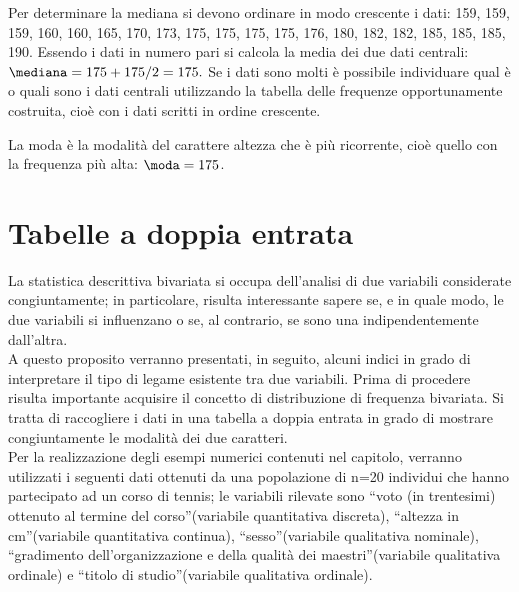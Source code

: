 \begin{esempio}
Per determinare la mediana si devono ordinare in modo crescente i dati:
159, 159, 159, 160, 160, 165, 170, 173, 175, 175, 175, 175, 176, 180, 182, 
182, 185, 185, 185, 190.
Essendo i dati in numero pari si calcola la media dei due dati centrali:
\(\mediana = {175+175}/{2}=175.\)
Se i dati sono molti è possibile individuare qual è o quali sono i dati 
centrali utilizzando la tabella delle
frequenze opportunamente costruita, cioè con i dati scritti in ordine 
crescente.

La moda è la modalità del carattere altezza che è più ricorrente, cioè 
quello con la frequenza più alta:
\(\moda = 175\).
\end{esempio}



\section{Tabelle a doppia entrata}
\label{sec:stat02_doppia_entrata}

La statistica descrittiva bivariata si occupa dell'analisi di due variabili 
considerate congiuntamente; in particolare, risulta interessante sapere se, 
e in quale modo, le due variabili si influenzano o se, al contrario, se 
sono una indipendentemente dall'altra.\\ 
A questo proposito verranno presentati, in seguito, alcuni indici in grado 
di interpretare il tipo di legame esistente tra due variabili. Prima di 
procedere risulta importante acquisire il concetto di distribuzione di 
frequenza bivariata. 
Si tratta di raccogliere i dati in una tabella a doppia entrata in grado di 
mostrare congiuntamente le modalità dei due caratteri.\\
Per la realizzazione degli esempi numerici contenuti nel capitolo, verranno 
utilizzati i seguenti dati ottenuti da una popolazione di n=20 individui 
che hanno partecipato ad un corso di tennis; le variabili rilevate sono 
\textquotedblleft voto (in trentesimi) ottenuto al termine del 
corso\textquotedblright (variabile quantitativa discreta), 
\textquotedblleft altezza in cm\textquotedblright (variabile quantitativa 
continua), \textquotedblleft sesso\textquotedblright (variabile qualitativa 
nominale), \textquotedblleft gradimento dell'organizzazione e della qualità 
dei maestri\textquotedblright (variabile qualitativa ordinale) e 
\textquotedblleft titolo di studio\textquotedblright (variabile qualitativa 
ordinale).

